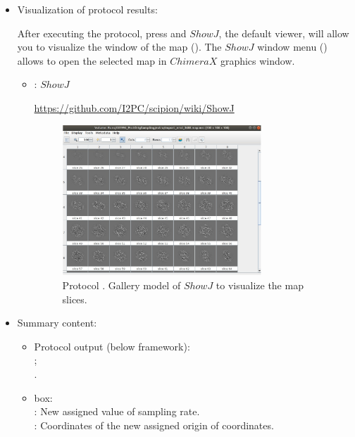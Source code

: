 \begin{itemize}
  \item Visualization of protocol results:
  
  After executing the protocol, press  and $ShowJ$, the default \scipion viewer, will allow you to visualize the  window of the map  (). The $ShowJ$ window menu () allows to open the selected map in $ChimeraX$ graphics window.
   
   \begin{itemize}
  \item {}: $ShowJ$
   
\url{https://github.com/I2PC/scipion/wiki/ShowJ}


   \begin{figure}[H]
   \centering 
    \captionsetup{width=.7\linewidth} 
    \includegraphics[width=0.75\textwidth]{Images_appendix/Fig302.pdf}
    \caption{Protocol . Gallery model of $ShowJ$ to visualize the map slices.}
    \label{fig:app_protocol_assign_orig_and_sampling_2}
   \end{figure}
   
   \end{itemize}
   
   \item Summary content:
    
    \begin{itemize}
     \item Protocol output (below \scipion framework):\\ ;\\ .
     \item {} box:\\: New assigned value of sampling rate.\\: Coordinates  of the new assigned origin of coordinates.
    \end{itemize}
  
  \end{itemize}
